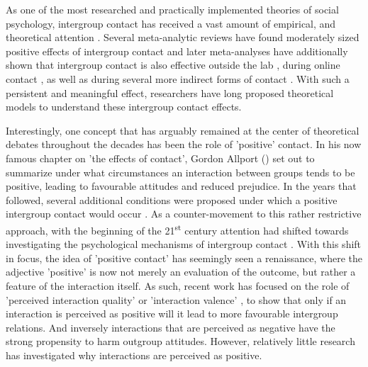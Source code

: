 \documentclass[man, 12pt, a4paper]{apa7}
\theoremstyle{break}
\theoremstyle{plain}
\begin{document}
As one of the most researched and practically implemented theories of social psychology, intergroup contact has received a vast amount of empirical, and theoretical attention \citep[][]{Dovidio2017}. Several meta-analytic reviews have found moderately sized positive effects of intergroup contact \citep[][]{Tropp2005, Pettigrew2006, Davies2011} and later meta-analyses have additionally shown that intergroup contact is also effective outside the lab \citep[][]{Beelmann2014, Lemmer2015}, during online contact \citep[][]{White2020}, as well as during several more indirect forms of contact \citep[][]{Miles2014, Zhou2019, Harwood2021}. With such a persistent and meaningful effect, researchers have long proposed theoretical models to understand these intergroup contact effects. 

Interestingly, one concept that has arguably remained at the center of theoretical debates throughout the decades has been the role of 'positive' contact. In his now famous chapter on 'the effects of contact', Gordon Allport (\citeyear{Allport1954b}) set out to summarize under what circumstances an interaction between groups tends to be positive, leading to favourable attitudes and reduced prejudice. In the years that followed, several additional conditions were proposed under which a positive intergroup contact would occur \citep[for a critical review see][]{Pettigrew1986}. As a counter-movement to this rather restrictive approach, with the beginning of the 21\textsuperscript{st} century attention had shifted towards investigating the psychological mechanisms of intergroup contact \citep[e.g. see,][]{Paolini2021}. With this shift in focus, the idea of 'positive contact' has seemingly seen a renaissance, where the adjective 'positive' is now not merely an evaluation of the outcome, but rather a feature of the interaction itself. As such, recent work has focused on the role of 'perceived interaction quality' \citep[e.g.,][]{Brown2007, Voci2003} or 'interaction valence' \citep[e.g.,][]{Tropp2016, Barlow2012}, to show that only if an interaction is perceived as positive will it lead to more favourable intergroup relations. And inversely interactions that are perceived as negative have the strong propensity to harm outgroup attitudes. However, relatively little research has investigated why interactions are perceived as positive.
\end{document}
